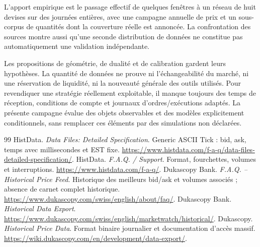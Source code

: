 L'apport empirique est le passage effectif de quelques fenêtres à un réseau de huit devises sur des journées entières, avec une campagne annuelle de prix et un sous-corpus de quantités dont la couverture réelle est annoncée. La confrontation des sources montre aussi qu'une seconde distribution de données ne constitue pas automatiquement une validation indépendante.

Les propositions de géométrie, de dualité et de calibration gardent leurs hypothèses. La quantité de données ne prouve ni l'échangeabilité du marché, ni une réservation de liquidité, ni la nouveauté générale des outils utilisés. Pour revendiquer une stratégie réellement exploitable, il manque toujours des temps de réception, conditions de compte et journaux d'ordres/exécutions adaptés. La présente campagne évalue des objets observables et des modèles explicitement conditionnels, sans remplacer ces éléments par des simulations non déclarées.

\clearpage
\renewcommand{\refname}{Sources de la campagne empirique}
\begin{thebibliography}{99}
\setcounter{enumiv}{30}
 HistData. \emph{Data Files: Detailed Specification}. Generic ASCII Tick : bid, ask, temps avec millisecondes et EST fixe. \url{https://www.histdata.com/f-a-q/data-files-detailed-specification/}.
 HistData. \emph{F.A.Q. / Support}. Format, fourchettes, volumes et interruptions. \url{https://www.histdata.com/f-a-q/}.
 Dukascopy Bank. \emph{F.A.Q. -- Historical Price Feed}. Historique des meilleurs bid/ask et volumes associés ; absence de carnet complet historique. \url{https://www.dukascopy.com/swiss/english/about/faq/}.
 Dukascopy Bank. \emph{Historical Data Export}. \url{https://www.dukascopy.com/swiss/english/marketwatch/historical/}.
 Dukascopy. \emph{Historical Price Data}. Format binaire journalier et documentation d'accès massif. \url{https://wiki.dukascopy.com/en/development/data-export/}.
\end{thebibliography}
